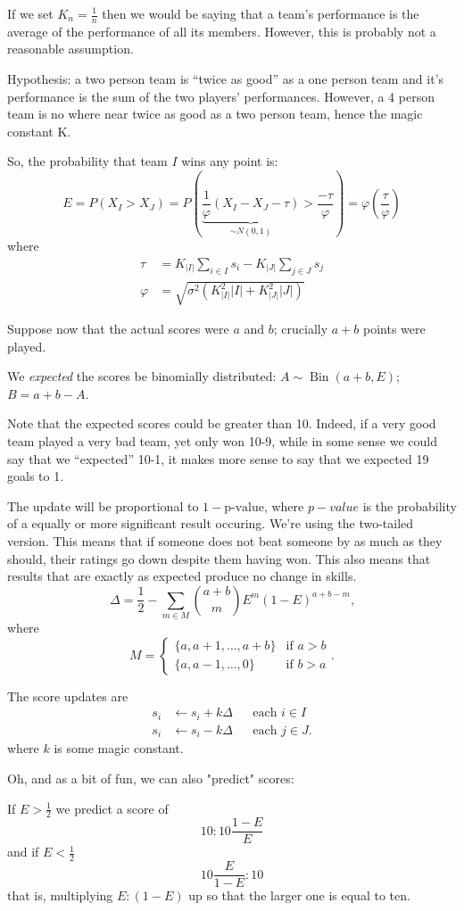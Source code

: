 \documentclass{article}
\begin{document}
If we set $K_n = \frac{1}{n}$ then we would be saying that a team's performance is the average of the performance of all its members. However, this is probably not a reasonable assumption.

Hypothesis: a two person team is ``twice as good'' as a one person team and it's performance is the sum of the two players' performances. However, a 4 person team is no where near twice as good as a two person team, hence the magic constant K. 

So, the probability that team $I$ wins any point is:
\[
    E = P( X_I > X_J ) = P\left( \underbrace{ \frac{1}{\varphi} ( X_I - X_J - \tau ) }_{\sim N(0, 1)}
                                 > \frac{-\tau}{\varphi} \right)
                       = \varphi\left( \frac{\tau}{\varphi} \right)
\]
where
\begin{align*}
    \tau &= K_{|I|} \sum_{i \in I} s_i - K_{|J|} \sum_{j \in J} s_j \\
    \varphi &= \sqrt{ \sigma^2 ( K_{|I|}^2 |I| + K_{|J|}^2 |J| ) }
\end{align*}

Suppose now that the actual scores were $a$ and $b$; crucially $a + b$ points were played.

We {\it expected} the scores be binomially distributed: $A\sim\operatorname{Bin}(a + b, E)$; $B = a + b - A$.

Note that the expected scores could be greater than 10. Indeed, if a very good team played a very bad team, yet only won 10-9, while in some sense we could say that we ``expected'' 10-1, it makes more sense to say that we expected 19 goals to 1.

The update will be proportional to $1 - \text{p-value}$, where $p-value$ is the probability of a equally or more significant result occuring. We're using the two-tailed version. This means that if someone does not beat someone by as much as they should, their ratings go down despite them having won. This also means that results that are exactly as expected produce no change in skills.
\[
    \Delta = \frac{1}{2} - \sum_{m \in M} {a + b \choose m} E^m (1 - E)^{a + b - m}
    \text{,}
\]
where
\[
    M = \begin{cases}
        \{ a, a + 1, \ldots, a + b \}  &\text{if } a > b \\
        \{ a, a - 1, \ldots, 0 \}      &\text{if } b > a
    \end{cases}
    \text{.}
\]

The score updates are
\begin{align*}
    s_i &\leftarrow s_i + k \Delta && \text{each } i \in I \\
    s_i &\leftarrow s_i - k \Delta && \text{each } j \in J
    \text{.}
\end{align*}
where $k$ is some magic constant.


Oh, and as a bit of fun, we can also "predict" scores:

If $E > \frac{1}{2}$ we predict a score of
\[
    10 : 10 \frac{1 - E}{E}
\]
and if $E < \frac{1}{2}$
\[
    10 \frac{E}{1 - E} : 10
\]
that is, multiplying $E : (1 - E)$ up so that the larger one is equal to ten.
\end{document}
